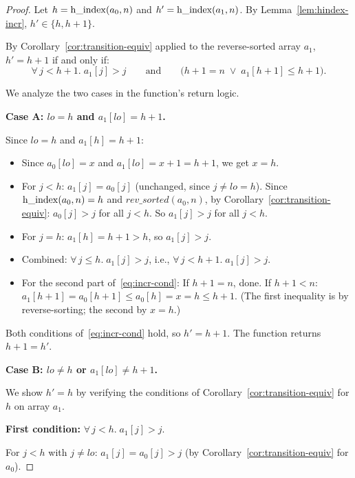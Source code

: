 \begin{proof}
Let $h = \operatorname{h\_index}(a_0, n)$ and $h' = \operatorname{h\_index}(a_1, n)$.
By Lemma~\ref{lem:hindex-incr}, $h' \in \{h, h+1\}$.

By Corollary~\ref{cor:transition-equiv} applied to the reverse-sorted array $a_1$,
$h' = h + 1$ if and only if:
\begin{equation}\label{eq:incr-cond}
  \forall\, j < h{+}1.\; a_1[j] > j
  \qquad\text{and}\qquad
  \bigl(h{+}1 = n \;\vee\; a_1[h{+}1] \leq h{+}1\bigr).
\end{equation}

We analyze the two cases in the function's return logic.

\medskip\noindent
\textbf{Case A: $\mathit{lo} = h$ and $a_1[\mathit{lo}] = h + 1$.}

Since $\mathit{lo} = h$ and $a_1[h] = h + 1$:
\begin{itemize}
  \item Since $a_0[\mathit{lo}] = x$ and $a_1[\mathit{lo}] = x + 1 = h + 1$, we get $x = h$.
  \item For $j < h$: $a_1[j] = a_0[j]$ (unchanged, since $j \neq \mathit{lo} = h$).
    Since $\operatorname{h\_index}(a_0, n) = h$ and $\mathit{rev\_sorted}(a_0, n)$,
    by Corollary~\ref{cor:transition-equiv}: $a_0[j] > j$ for all $j < h$.
    So $a_1[j] > j$ for all $j < h$.
  \item For $j = h$: $a_1[h] = h + 1 > h$, so $a_1[j] > j$.
  \item Combined: $\forall\, j \leq h.\; a_1[j] > j$, i.e., $\forall\, j < h{+}1.\; a_1[j] > j$.
  \item For the second part of~\eqref{eq:incr-cond}: If $h + 1 = n$, done.
    If $h + 1 < n$: $a_1[h{+}1] = a_0[h{+}1] \leq a_0[h] = x = h \leq h + 1$.
    (The first inequality is by reverse-sorting; the second by $x = h$.)
\end{itemize}
Both conditions of~\eqref{eq:incr-cond} hold, so $h' = h + 1$.
The function returns $h + 1 = h'$. \checkmark

\medskip\noindent
\textbf{Case B: $\mathit{lo} \neq h$ or $a_1[\mathit{lo}] \neq h + 1$.}

We show $h' = h$ by verifying the conditions of Corollary~\ref{cor:transition-equiv}
for $h$ on array $a_1$.

\textbf{First condition:} $\forall\, j < h.\; a_1[j] > j$.

For $j < h$ with $j \neq \mathit{lo}$: $a_1[j] = a_0[j] > j$ (by Corollary~\ref{cor:transition-equiv}
for $a_0$).


\end{proof}
